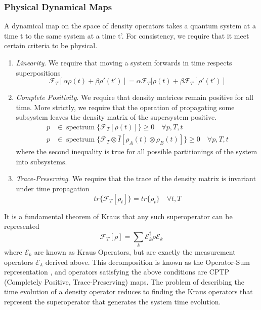 \subsubsection{Physical Dynamical Maps}
A dynamical map on the space of density operators takes a quantum system at a time t to the same system at a time t'.
For consistency, we require that it meet certain criteria to be physical.
\begin{enumerate}
    \item \emph{Linearity}. We require that moving a system forwards in time respects superpositions 
        \begin{equation}
            \mathscr{F}_T[\alpha\rho(t) + \beta\rho'(t')] = \alpha \mathscr{F}_T[\rho(t) + \beta \mathscr{F}_T[\rho'(t')]
        \end{equation}
    \item \emph{Complete Positivity}.  We require that density matrices remain positive for all time.
        More strictly, we require that the operation of propagating some subsystem leaves the density matrix of the supersystem positive.
        \begin{align}
          p & \in  \operatorname{spectrum} \{\mathscr{F}_T[\rho(t)]\} \geq  0\quad \forall p, T, t\\
          p & \in  \operatorname{spectrum} \{\mathscr{F}_T \otimes \hat{I} [\rho_A(t) \otimes\rho_B(t) ] \} \geq 0 \quad \forall p, T, t
        \end{align}
        where the second inequality is true for all possible partitionings of the system into subsystems.
    \item \emph{Trace-Preserving}. We require that the trace of the density matrix is invariant under time propagation
        \begin{equation}
            tr\{ \mathscr{F}_T[\rho_t] \} = tr \{ \rho_t \} \quad \forall t, T
        \end{equation}
\end{enumerate}
It is a fundamental theorem of Kraus \cite{Kraus1983} that any such superoperator can be represented \cite{Nielsen2010}
\begin{equation}
    \mathscr{F}_T[\rho] = \sum_k \mathscr{E}_k^\dagger \rho \mathscr{E}_k
    \label{kraus}
\end{equation}
where $\mathscr{E}_k $ are known as Kraus Operators, but are exactly the measurement operators $\mathscr{E}_\lambda$ derived above.
This decomposition is known as the Operator-Sum representation \cite{Nielsen2010}, and operators satisfying the above conditions are CPTP (Completely Positive, Trace-Preserving) maps.
The problem of describing the time evolution of a density operator reduces to finding the Kraus operators that represent the superoperator that generates the system time evolution.


